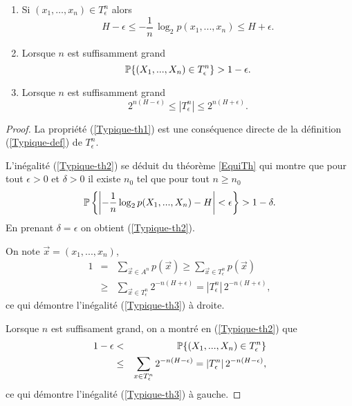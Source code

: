 \begin{proposition} 
\begin{enumerate}[label=(\roman*)]
\item  Si $(x_1, \dots , x_n) \in T^n_\epsilon$ alors
\begin{equation}
\label{Typique-th1}
H - \epsilon \leq - \frac 1 n \,\log_2 p(x_1, ... , x_n)  \leq H + \epsilon .
\end{equation}
\item Lorsque $n$ est suffisamment grand
\begin{equation}
\label{Typique-th2}
\mathbb{P} \{(X_1, ...,X_n) \in T^n_\epsilon \} > 1 - \epsilon .
\end{equation}
\item  Lorsque $n$ est suffisamment grand
\begin{equation}
\label{Typique-th3}
2^{n(H - \epsilon)} \leq |T^n_\epsilon| \leq
2^{n(H + \epsilon)} .
\end{equation}
\end{enumerate}
\end{proposition}
\begin{proof}
La propri\'et\'e (\ref{Typique-th1}) est une
cons\'equence directe de la d\'efinition (\ref{Typique-def})
de $T^n_\epsilon$.

L'in\'egalit\'e (\ref{Typique-th2})
se d\'eduit du th\'eor\`eme \ref{EquiTh} qui montre
que pour tout $\epsilon>0$ et $\delta > 0$ il existe $n_0$
tel que pour tout $n \geq n_0$
\[
\mathbb{P} \left\{\left|  -\frac 1 n \log_2 p(X_1, ... , X_n) - H \right|
< \epsilon \right\} >
1 - \delta .
\]
En prenant $\delta = \epsilon$ on obtient (\ref{Typique-th2}).

On note $\vec x = (x_1 , ... , x_n)$,
\begin{eqnarray*}
1 &=& \sum_{\vec x \in A^n} p(\vec x) \geq \sum_{\vec x \in T^n_\epsilon} p(\vec x) \\
& \geq & \sum_{\vec x \in T^n_\epsilon} 2^{-n(H +\epsilon)} =
|T^n_\epsilon|\, 2^{-n(H +\epsilon)} ,
\end{eqnarray*}
ce qui d\'emontre l'in\'egalit\'e (\ref{Typique-th3})
\`a droite.

Lorsque $n$ est suffisament grand, on a montr\'e en
(\ref{Typique-th2}) que
\begin{eqnarray*}
1 - \epsilon & < &\mathbb{P} \{(X_1, ...,X_n) \in T^n_\epsilon \} \\
& \leq & \sum_{x \in T^n_\epsilon} 2^{-n(H-\epsilon)} =
|T^n_\epsilon| \, 2^{-n(H-\epsilon)} ,
\end{eqnarray*}
ce qui d\'emontre l'in\'egalit\'e (\ref{Typique-th3})
\`a gauche.
\end{proof}
\\
\\

